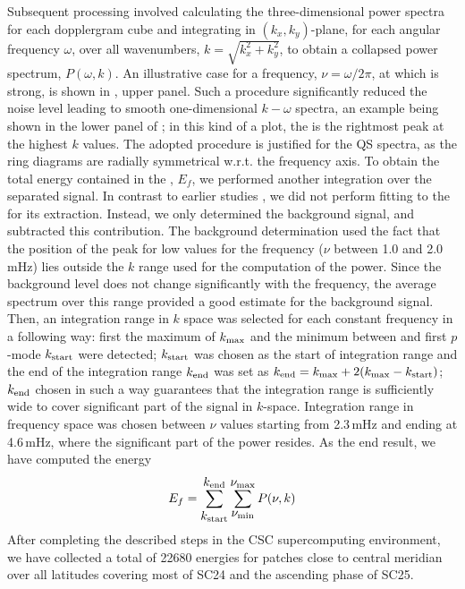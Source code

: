 \documentclass{aa}
\begin{document}
Subsequent processing involved calculating the 
three-dimensional
power spectra for each dopplergram cube and 
integrating
in $(k_x, k_y)$-plane, for each 
angular
frequency 
$\omega$,
over all wavenumbers, 
$k=\sqrt{k_x^2+k_y^2}$,
to obtain a collapsed power spectrum, 
$P(\omega,k)$. 
An illustrative case for a frequency, $\nu=\omega/2 \pi$,
at which \fff is strong, is shown in 
,
upper panel.
Such a procedure
significantly reduced the noise level leading to smooth one-dimensional $k-\omega$ spectra,
an example being shown in the lower panel of ;
in this kind of a plot, the \fff is the rightmost peak at the highest $k$ values.
The adopted procedure
is justified for the 
QS
spectra, as the ring diagrams are radially symmetrical w.r.t. 
the frequency axis. 
To obtain the total energy contained in the \fffns, $E_f$, we
performed another integration over the separated \fff signal.
In contrast to earlier studies \citep{SRB16,Waidele22}, we
did not perform fitting to the \fff for its extraction. 
Instead, we only determined the background signal, and subtracted this contribution.
The background determination used the fact that the position of the \fff peak for low values for 
the frequency ($\nu$ between 1.0 and 2.0\,mHz)
lies outside the $k$ range used for the computation of the \fff power. Since the background level does not change significantly with 
the frequency, the average spectrum over this range provided a good estimate for the background signal.
Then,
an integration range in $k$ space was selected for each constant 
frequency
in a following way: first the maximum of \fff $k_{\rm max}$ and the minimum between \fff and first $p$-mode $k_{\rm start}$ were detected; $k_{\rm start}$ was chosen as the start of integration range and the end of the integration range $k_{\rm end}$ was set as $k_{\rm end}=k_{\rm max}+2(k_{\rm max}-k_{\rm start})$; $k_{\rm end}$ chosen in such a way guarantees that the integration range is sufficiently wide to cover significant part of the \fff 
signal in $k$-space.
Integration range in 
frequency space was chosen between $\nu$ values starting from 2.3\,mHz and ending at 4.6\,mHz,
where the significant part of the \fff power resides. 
As the end result, we have computed the \fff energy
\begin{equation}
E_f=
\sum_{\mbox{$k_{\rm start}$}}^{\mbox{$k_{\rm end}$}}
\sum_{\mbox{$\nu_{\rm min}$}}^{\mbox{$\nu_{\rm max}$}} P(\nu,k)
\end{equation}
After completing the described steps in the CSC supercomputing
environment, we have collected a total of 
22680
\fff
energies
for patches close to central meridian over all latitudes covering 
most of SC24 and the ascending phase of SC25.
\end{document}
